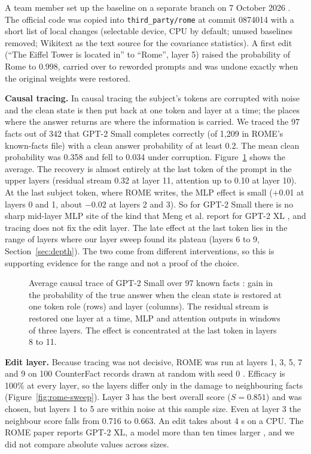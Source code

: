 A team member set up the baseline on a separate branch on 7 October 2026 \cite{p15}. The official code \cite{r64} was copied into \texttt{third\_party/rome} at commit 0874014 with a short list of local changes (selectable device, CPU by default; unused baselines removed; Wikitext \cite{r55} as the text source for the covariance statistics). A first edit (``The Eiffel Tower is located in'' to ``Rome'', layer 5) raised the probability of Rome to 0.998, carried over to reworded prompts and was undone exactly when the original weights were restored.

\textbf{Causal tracing.} In causal tracing \cite{r2,r58,r59} the subject's tokens are corrupted with noise and the clean state is then put back at one token and layer at a time; the places where the answer returns are where the information is carried. We traced the 97 facts out of 342 that GPT-2 Small completes correctly (of 1,209 in ROME's known-facts file) with a clean answer probability of at least 0.2. The mean clean probability was 0.358 and fell to 0.034 under corruption. Figure~\ref{fig:rome-trace} shows the average. The recovery is almost entirely at the last token of the prompt in the upper layers (residual stream 0.32 at layer 11, attention up to 0.10 at layer 10). At the last subject token, where ROME writes, the MLP effect is small (+0.01 at layers 0 and 1, about $-0.02$ at layers 2 and 3). So for GPT-2 Small there is no sharp mid-layer MLP site of the kind that Meng et al. report for GPT-2 XL \cite{r2}, and tracing does not fix the edit layer. The late effect at the last token lies in the range of layers where our layer sweep found its plateau (layers 6 to 9, Section~\ref{sec:depth}). The two come from different interventions, so this is supporting evidence for the range and not a proof of the choice.

\begin{figure}[!htb]
\centering
{}
\caption{Average causal trace of GPT-2 Small over 97 known facts \cite{p15}: gain in the probability of the true answer when the clean state is restored at one token role (rows) and layer (columns). The residual stream is restored one layer at a time, MLP and attention outputs in windows of three layers. The effect is concentrated at the last token in layers 8 to 11.}\label{fig:rome-trace}
\end{figure}

\textbf{Edit layer.} Because tracing was not decisive, ROME was run at layers 1, 3, 5, 7 and 9 on 100 CounterFact records drawn at random with seed 0 \cite{p15}. Efficacy is 100\% at every layer, so the layers differ only in the damage to neighbouring facts (Figure~\ref{fig:rome-sweep}). Layer 3 has the best overall score ($S=0.851$) and was chosen, but layers 1 to 5 are within noise at this sample size. Even at layer 3 the neighbour score falls from 0.716 to 0.663. An edit takes about 4 s on a CPU. The ROME paper reports GPT-2 XL, a model more than ten times larger \cite{r1,r2}, and we did not compare absolute values across sizes.

